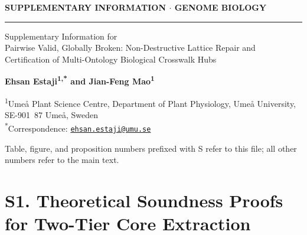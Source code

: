 \documentclass[10pt]{article}
\theoremstyle{accentthm}
\begin{document}
\thispagestyle{firstpage}

{\setlength{\parindent}{0pt}%
{\footnotesize\bfseries\color{accent}\lsstyle SUPPLEMENTARY INFORMATION $\cdot$ GENOME BIOLOGY}\par\vspace{2pt}
{\color{accent}\rule{\textwidth}{1.0pt}}\par\vspace{8pt}
{\LARGE\bfseries\color{ink}\raggedright Supplementary Information for\\Pairwise Valid, Globally Broken: Non-Destructive Lattice Repair and Certification of Multi-Ontology Biological Crosswalk Hubs\par}
\vspace{8pt}
{\normalsize\bfseries\color{ink}Ehsan Estaji\textsuperscript{1,*} \quad and \quad Jian-Feng Mao\textsuperscript{1}\par}
\vspace{4pt}
{\small\color{muted}%
\textsuperscript{1}Ume{\aa} Plant Science Centre, Department of Plant Physiology, Ume{\aa} University, SE-901~87 Ume{\aa}, Sweden\\[1.5pt]
\textsuperscript{*}Correspondence: \href{mailto:ehsan.estaji@umu.se}{\texttt{ehsan.estaji@umu.se}}\par}
\vspace{6pt}%
}

{\small\color{muted}Table, figure, and proposition numbers prefixed with S refer to this file; all other numbers refer to the main text.}

\section*{S1. Theoretical Soundness Proofs for Two-Tier Core Extraction}
\end{document}
